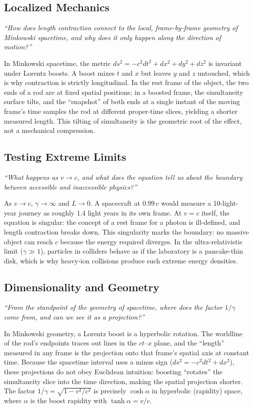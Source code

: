 \subsection*{Localized Mechanics}
\textit{``How does length contraction connect to the local, frame-by-frame geometry of Minkowski spacetime, and why does it only happen along the direction of motion?''}

In Minkowski spacetime, the metric $ds^{2} = -c^{2}dt^{2} + dx^{2} + dy^{2} + dz^{2}$ is invariant under Lorentz boosts. A boost mixes $t$ and $x$ but leaves $y$ and $z$ untouched, which is why contraction is strictly longitudinal. In the rest frame of the object, the two ends of a rod are at fixed spatial positions; in a boosted frame, the simultaneity surface tilts, and the ``snapshot'' of both ends at a single instant of the moving frame's time samples the rod at different proper-time slices, yielding a shorter measured length. This tilting of simultaneity is the geometric root of the effect, not a mechanical compression.

\subsection*{Testing Extreme Limits}
\textit{``What happens as $v \to c$, and what does the equation tell us about the boundary between accessible and inaccessible physics?''}

As $v \to c$, $\gamma \to \infty$ and $L \to 0$. A spacecraft at $0.99\,c$ would measure a 10-light-year journey as roughly 1.4 light years in its own frame. At $v = c$ itself, the equation is singular: the concept of a rest frame for a photon is ill-defined, and length contraction breaks down. This singularity marks the boundary: no massive object can reach $c$ because the energy required diverges. In the ultra-relativistic limit ($\gamma \gg 1$), particles in colliders behave as if the laboratory is a pancake-thin disk, which is why heavy-ion collisions produce such extreme energy densities.

\subsection*{Dimensionality and Geometry}
\textit{``From the standpoint of the geometry of spacetime, where does the factor $1/\gamma$ come from, and can we see it as a projection?''}

In Minkowski geometry, a Lorentz boost is a hyperbolic rotation. The worldline of the rod's endpoints traces out lines in the $ct$--$x$ plane, and the ``length'' measured in any frame is the projection onto that frame's spatial axis at constant time. Because the spacetime interval uses a minus sign ($ds^{2} = -c^{2}dt^{2} + dx^{2}$), these projections do not obey Euclidean intuition: boosting ``rotates'' the simultaneity slice into the time direction, making the spatial projection shorter. The factor $1/\gamma = \sqrt{1 - v^{2}/c^{2}}$ is precisely $\cosh\alpha$ in hyperbolic (rapidity) space, where $\alpha$ is the boost rapidity with $\tanh\alpha = v/c$.

